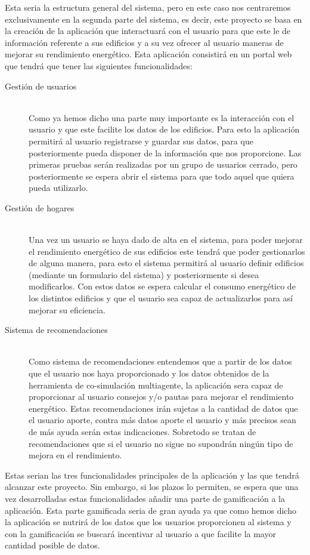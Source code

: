 Esta seria la estructura general del sistema, pero en este caso nos centraremos exclusivamente en la segunda parte del sistema, es decir, este proyecto se basa en la creación de la aplicación que interactuará con el usuario para que este le de información referente a sus edificios y a su vez ofrecer al usuario maneras de mejorar su rendimiento energético. Esta aplicación consistirá en un portal web que tendrá que tener las siguientes funcionalidades:
\begin{description}
  \item[Gestión de usuarios] \hfill \\
  Como ya hemos dicho una parte muy importante es la interacción con el usuario y que este facilite los datos de los edificios. Para esto la aplicación permitirá al usuario registrarse y guardar sus datos, para que posteriormente pueda disponer de la información que nos proporcione. Las primeras pruebas serán realizadas por un grupo de usuarios cerrado, pero posteriormente se espera abrir el sistema para que todo aquel que quiera pueda utilizarlo.
  \item[Gestión de hogares] \hfill \\
  Una vez un usuario se haya dado de alta en el sistema, para poder mejorar el rendimiento energético de sus edificios este tendrá que poder gestionarlos de alguna manera, para esto el sistema permitirá al usuario definir edificios (mediante un formulario del sistema) y posteriormente si desea modificarlos. Con estos datos se espera calcular el consumo energético de los distintos edificios y que el usuario sea capaz de actualizarlos para así mejorar su eficiencia.
  \item[Sistema de recomendaciones]\hfill \\
  Como sistema de recomendaciones entendemos que a partir de los datos que el usuario nos haya proporcionado y los datos obtenidos de la herramienta de co-simulación multiagente, la aplicación sera capaz de proporcionar al usuario consejos y/o pautas para mejorar el rendimiento energético. Estas recomendaciones irán sujetas a la cantidad de datos que el usuario aporte, contra más datos aporte el usuario y más precisos sean de más ayuda serán estas indicaciones. Sobretodo se tratan de recomendaciones que si el usuario no sigue no supondrán ningún tipo de mejora en el rendimiento.
\end{description}

Estas serian las tres funcionalidades principales de la aplicación y las que tendrá alcanzar este proyecto. Sin embargo, si los plazos lo permiten, se espera que una vez desarrolladas estas funcionalidades añadir una parte de gamificación a la aplicación. Esta parte gamificada seria de gran ayuda ya que como hemos dicho la aplicación se nutrirá de los datos que los usuarios proporcionen al sistema y con la gamificación se buscará incentivar al usuario a que facilite la mayor cantidad posible de datos.

